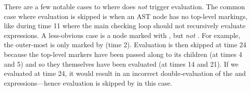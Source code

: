 There are a few notable cases to where 
does \emph{not} trigger evaluation.
The common case where evaluation is skipped is when an AST node has no top-level markings,
like during time 11 where the main checking loop
should not recursively evaluate expressions.
A less-obvious case is a node marked with ,
but \emph{not} .
For example, the outer-most  is only marked by
 (time 2). Evaluation is then skipped at time 24 because
the top-level markers have been passed along to its children
(at times 4 and 5)
and so they themselves
have been evaluated
(at times 14 and 21). If we evaluated at time 24,
it would result in
an incorrect double-evaluation of the  and  expressions---hence
evaluation is skipped by  in this case.

